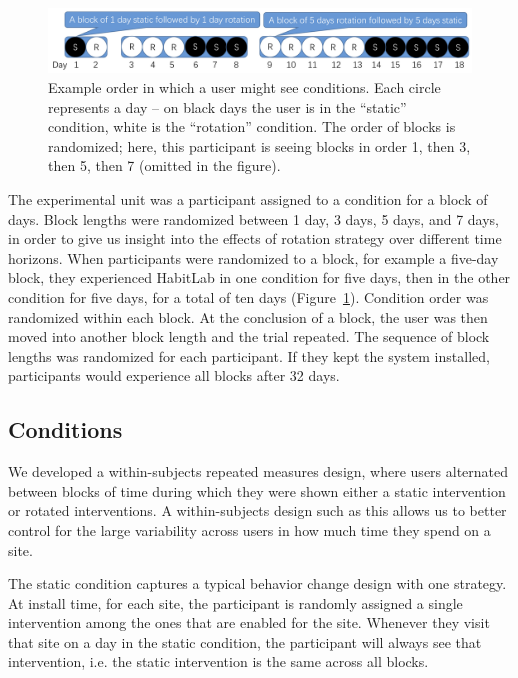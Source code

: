
\begin{figure}
\centering
	\includegraphics[width=1.0\textwidth]{figures/experiment1_design_figure_v2.png}
	\caption{Example order in which a user might see conditions. Each circle represents a day -- on black days the user is in the ``static'' condition, white is the ``rotation'' condition. The order of blocks is randomized; here, this participant is seeing blocks in order 1, then 3, then 5, then 7 (omitted in the figure).}
\label{fig:experiment1_design_figure}
\end{figure}

The experimental unit was a participant assigned to a condition for a block of days. Block lengths were randomized between 1 day, 3 days, 5 days, and 7 days, in order to give us insight into the effects of rotation strategy over different time horizons. When participants were randomized to a block, for example a five-day block, they experienced HabitLab in one condition for five days, then in the other condition for five days, for a total of ten days (Figure~\ref{fig:experiment1_design_figure}). Condition order was randomized within each block. At the conclusion of a block, the user was then moved into another block length and the trial repeated. The sequence of block lengths was randomized for each participant. If they kept the system installed, participants would experience all blocks after 32 days.

\subsection{Conditions}
We developed a within-subjects repeated measures design, where users alternated between blocks of time during which they were shown either a static intervention or rotated interventions. A within-subjects design such as this allows us to better control for the large variability across users in how much time they spend on a site.

The static condition captures a typical behavior change design with one strategy. At install time, for each site, the participant is randomly assigned a single intervention among the ones that are enabled for the site. Whenever they visit that site on a day in the static condition, the participant will always see that intervention, i.e. the static intervention is the same across all blocks.

